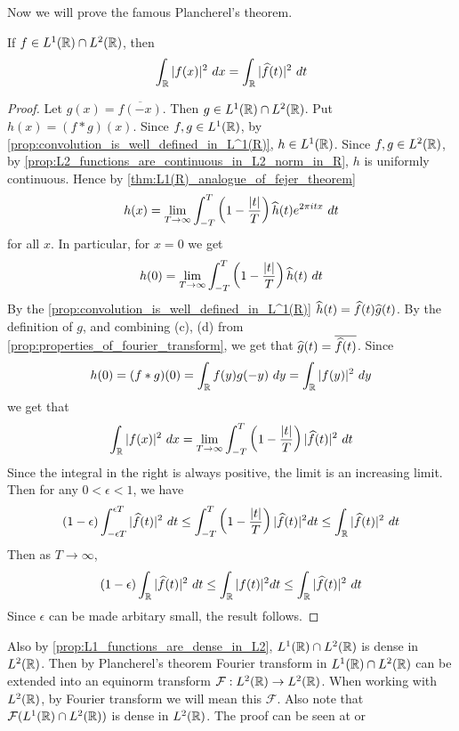 Now we will prove the famous Plancherel's theorem.
\begin{theorem}
  \label{thm:Plancherel's_theorem}
  If $f \in L^1(\mathbb R) \cap L^2(\mathbb R)$, then $$\int_\R |f(x)|^2 \ dx = \int_\R |\hatf(t)|^2 \ dt $$
\end{theorem}
\begin{proof}
  Let $g(x) = \overline{f(-x)}$. Then $g \in L^1(\mathbb R)\cap L^2(\mathbb R)$. Put $h(x) = (f*g)(x)$. Since $f, g \in L^1(\mathbb R)$, by \autoref{prop:convolution_is_well_defined_in_L^1(R)}, $h \in L^1(\mathbb R)$. Since $f, g \in L^2(\mathbb R)$, by \autoref{prop:L2_functions_are_continuous_in_L2_norm_in_R}, $h$ is uniformly continuous. 
  Hence by \autoref{thm:L1(R)_analogue_of_fejer_theorem}  $$h(x) = \lim_{T\to \infty} \int_{-T}^T \left(1-\frac{|t|}{T}\right) \widehat{h}(t)e^{2\pi itx} \ dt $$ for all $x$. In particular, for $x=0$ we get $$h(0) = \lim_{T\to \infty} \int_{-T}^T \left(1-\frac{|t|}{T}\right) \widehat{h}(t) \ dt$$
  By the \autoref{prop:convolution_is_well_defined_in_L^1(R)} $\widehat{h}(t) = \widehat{f}(t)\widehat{g}(t)$. By the definition of $g$, and combining (c), (d) from \autoref{prop:properties_of_fourier_transform}, we get that $\widehat{g}(t) = \overline{\widehat{f}(t)}$.
  Since $$h(0) = (f*g)(0) = \int_\mathbb R f(y)g(-y) \ dy = \int_\mathbb R |f(y)|^2 \ dy$$
  we get that $$\int_\R |f(x)|^2 \ dx = \lim_{T\to \infty} \int_{-T}^T \left(1-\frac{|t|}{T}\right) |\hatf(t)|^2 \ dt$$
  Since the integral in the right is always positive, the limit is an increasing limit. Then for any $0<\epsilon<1$, we have $$(1-\epsilon) \int_{-\epsilon T}^{\epsilon T} |\hatf(t)|^2 \ dt \le \int_{-T}^{T} \left( 1-\frac{|t|}{T} \right) |\hatf(t)|^2 dt \le \int_\R |\hatf(t)|^2 \ dt$$
  Then as $T \to \infty$, $$(1-\epsilon) \int_\mathbb R |\widehat{f}(t)|^2 \ dt \le \int_{\mathbb R} |f(t)|^2 dt \le \int_\mathbb R |\widehat{f}(t)|^2 \ dt$$
  Since $\epsilon$ can be made arbitary small, the result follows.
\end{proof}

Also by \autoref{prop:L1_functions_are_dense_in_L2}, $L^1(\mathbb R) \cap L^2(\mathbb R)$ is dense in $L^2(\mathbb R)$. Then by Plancherel's theorem Fourier transform in $L^1(\mathbb R) \cap L^2(\mathbb R)$ can be extended into an equinorm transform $\mathcal{F} : L^2(\mathbb R) \to L^2(\mathbb R)$. When working with $L^2(\mathbb R)$, by Fourier transform we will mean this $\mathcal{F}$. Also note that $\mathcal{F}(L^1(\mathbb R) \cap L^2(\mathbb R))$ is dense in $L^2(\mathbb R)$. The proof can be seen at \autocite[Theorem~9.13 \pno~186]{papaRudin} or \autocite[Theorem~2.4.1 \pno~128]{PinskyWavelet}



